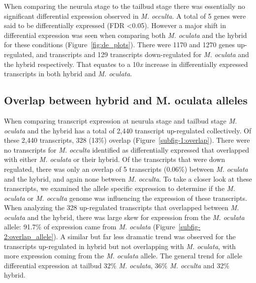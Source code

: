When comparing the neurula stage to the tailbud stage there was essentially no significant differential expression observed in \textit{M. occulta}. A total of 5 genes were said to be differentially expressed (FDR \textless 0.05). However a major shift in differential expression was seen when comparing both \textit{M. oculata} and the hybrid for these conditions (Figure~\ref{fig:de_plots}). There were 1170 and 1270 genes up-regulated, and transcripts and 129 transcripts down-regulated for \textit{M. oculata} and the hybrid respectively. That equates to a 10\textit{x} increase in differentially expressed transcripts in both hybrid and \textit{M. oculata}.

\subsection{Overlap between hybrid and M. oculata alleles}
When comparing transcript expression at neurula stage and tailbud stage \textit{M. oculata} and the hybrid has a total of 2,440 transcript up-regulated collectively. Of these 2,440 transcripts, 328 (13\%) overlap (Figure~\ref{subfig-1:overlap}). There were no transcripts for \textit{M. occulta} identified as differentially expressed that overlapped with either \textit{M. oculata} or their hybrid. Of the transcripts that were down regulated, there was only an overlap of 5 transcripts (0.06\%) between \textit{M. oculata} and the hybrid, and again none between \textit{M. occulta}. To take a closer look at these transcripts, we examined the allele specific expression to determine if the \textit{M. oculata} or \textit{M. occulta} genome was influencing the expression of these transcripts. When analyzing the 328 up-regulated transcripts that overlapped between \textit{M. oculata} and the hybrid, there was large skew for expression from the \textit{M. oculata} allele: 91.7\% of expression came from \textit{M. oculata} (Figure~\ref{subfig-2:overlap_allele}). A similar but far less dramatic trend was observed for the transcripts up-regulated in hybrid but not overlapping with \textit{M. oculata}, with more expression coming from the \textit{M. oculata} allele. The general trend for allele differential expression at tailbud 32\% \textit{M. oculata}, 36\% \textit{M. occulta} and 32\% hybrid.

